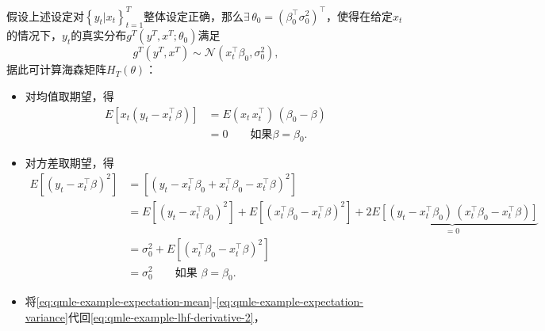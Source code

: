 假设上述设定对$\left\{ y_{t} | x_{t} \right\}_{t=1}^{T}$整体设定正确，那么$\exists \, \theta_{0} = \left( \beta_{0}^{\top} \sigma_{0}^{2} \right)^{\top}$，使得在给定$x_{t}$的情况下，$y_{t}$的真实分布$g^{T} \left(y^{T}, x^{T}; \theta_{0} \right) $满足
\begin{equation*}
g^{T} \left(y^{T}, x^{T} \right) \sim \mathcal{N} \left( x_{t}^{\top} \beta_{0}, \sigma_{0}^{2} \right),
\end{equation*}
据此可计算海森矩阵$H_{T} \left( \theta \right)$：
\begin{itemize}
\item 对均值取期望，得
\begin{equation}
    \label{eq:qmle-example-expectation-mean}
    \begin{split}
        E \left[ x_{t} \left( y_{t} - x_{t}^{\top} \beta \right) \right]
        & = E \left( x_{t} \, x_{t}^{\top} \right) \, \left( \beta_{0} - \beta \right) \\
        & = 0 \qquad \text{如果} \beta = \beta_{0}.
    \end{split}
\end{equation}
\item 对方差取期望，得
\begin{equation}
    \label{eq:qmle-example-expectation-variance}
    \begin{split}
        E \left[ \left( y_{t} - x_{t}^{\top} \beta \right)^{2} \right]
        & = \left[
        \left(
        y_{t} - x_{t}^{\top} \beta_{0} + x_{t}^{\top} \beta_{0} - x_{t}^{\top} \beta
        \right)^{2}
        \right] \\
        & = E \left[ \left( y_{t} - x_{t}^{\top} \beta_{0} \right)^{2} \right]
        + E \left[
        \left(
        x_{t}^{\top} \beta_{0} - x_{t}^{\top} \beta
        \right)^{2}
        \right]
        +
        \underbrace{
        2 E \left[
        \left( y_{t} - x_{t}^{\top} \beta_{0} \right) \,
        \left(x_{t}^{\top} \beta_{0} - x_{t}^{\top} \beta \right)
        \right]
        }_{=0} \\
        & = \sigma_{0}^{2}
        + E \left[
        \left(
        x_{t}^{\top} \beta_{0} - x_{t}^{\top} \beta
        \right)^{2}
        \right] \\
        & = \sigma_{0}^{2} \qquad \text{如果 } \beta=\beta_{0}.
    \end{split}
\end{equation}
\item 将\eqref{eq:qmle-example-expectation-mean}-\eqref{eq:qmle-example-expectation-variance}代回\eqref{eq:qmle-example-lhf-derivative-2}，

\end{itemize}
